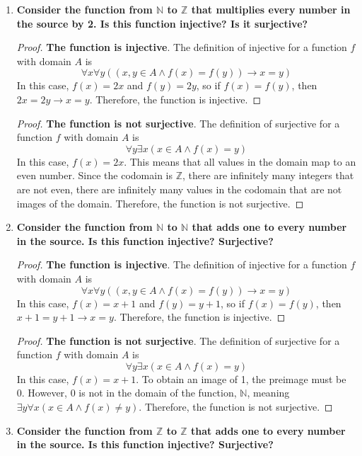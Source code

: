 \documentclass[article, 12pt]{article}
\theoremstyle{definition}
\newcommand{\ints}{\mathbb{Z}}
\newcommand{\nats}{\mathbb{N}}
\begin{document}
\begin{enumerate}[(1)]
\begin{enumerate}[(a)]
\begin{proof}
            \end{proof}
        \end{enumerate}
        \item \textbf{Consider the function from $\nats$ to $\ints$ that multiplies every number in the source by 2. Is this function injective? Is it surjective?}
        \begin{proof}
            \textbf{The function is injective}. The definition of injective for a function $f$ with domain $A$ is \[ \forall x \forall y((x,y \in A \land f(x) = f(y)) \to x = y) \] In this case, $f(x) = 2x$ and $f(y) = 2y$, so if $f(x) = f(y)$, then $2x = 2y \to x = y$. Therefore, the function is injective.
        \end{proof}
        \begin{proof}
            \textbf{The function is not surjective}. The definition of surjective for a function $f$ with domain $A$ is \[ \forall y \exists x(x \in A \land f(x) = y) \] In this case, $f(x) = 2x$. This means that all values in the domain map to an even number. Since the codomain is $\ints$, there are infinitely many integers that are not even, there are infinitely many values in the codomain that are not images of the domain. Therefore, the function is not surjective.
        \end{proof}
        \item \textbf{Consider the function from $\nats$ to $\nats$ that adds one to every number in the source. Is this function injective? Surjective?}
        \begin{proof}
            \textbf{The function is injective}. The definition of injective for a function $f$ with domain $A$ is \[ \forall x \forall y((x,y \in A \land f(x) = f(y)) \to x = y) \] In this case, $f(x) = x+1$ and $f(y) = y+1$, so if $f(x) = f(y)$, then $x+1 = y+1 \to x = y$. Therefore, the function is injective.
        \end{proof}
        \begin{proof}
            \textbf{The function is not surjective}. The definition of surjective for a function $f$ with domain $A$ is \[ \forall y \exists x(x \in A \land f(x) = y) \] In this case, $f(x) = x+1$. To obtain an image of 1, the preimage must be 0. However, 0 is not in the domain of the function, $\nats$, meaning $\exists y \forall x (x \in A \land f(x) \neq y)$. Therefore, the function is not surjective.
        \end{proof}
        \item \textbf{Consider the function from $\ints$ to $\ints$ that adds one to every number in the source. Is this function injective? Surjective?}

\end{enumerate}
\end{document}
